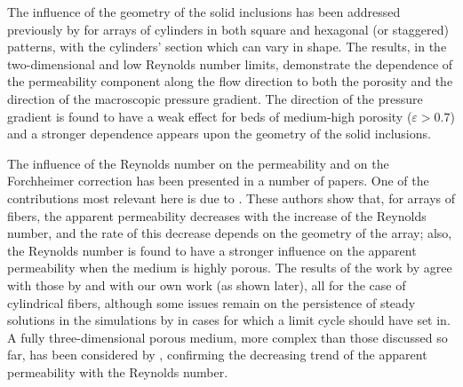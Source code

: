 The influence of the geometry of the solid inclusions has been addressed previously by \citet{yazdchi2011} for arrays of cylinders 
in both square and hexagonal (or staggered) patterns, with the cylinders' section which can vary in shape. The results, in the 
two-dimensional and low Reynolds number limits, demonstrate the dependence of the  permeability component along the flow direction to both 
the porosity and the direction of the macroscopic pressure gradient. The direction of the pressure gradient is found to have a weak effect 
for beds of medium-high porosity ($\varepsilon>0.7$) and a stronger dependence appears upon the geometry of the solid inclusions. 

The influence of the Reynolds number on the permeability and on the Forchheimer correction has been presented in a number of papers.
One of the contributions most relevant here is due to \citet{edwards1990}. These authors show that, for arrays of fibers, the apparent permeability decreases with the increase of the Reynolds number, and the rate of this decrease depends on the geometry of the array;
also, the Reynolds number is found to have a stronger influence on the apparent permeability when the medium is highly porous.
The results of the work by \citet{edwards1990} agree with those by \citet{zampogna} and with our own work (as shown later), all for
the case of cylindrical fibers, although some issues remain on the persistence of steady solutions in the simulations by \citet{edwards1990} 
in cases for which a limit cycle should have set in. A fully three-dimensional porous medium, more complex than those discussed so far, 
has been considered by \citet{soulaine2014}, confirming the decreasing trend of the apparent permeability with the Reynolds number. 

